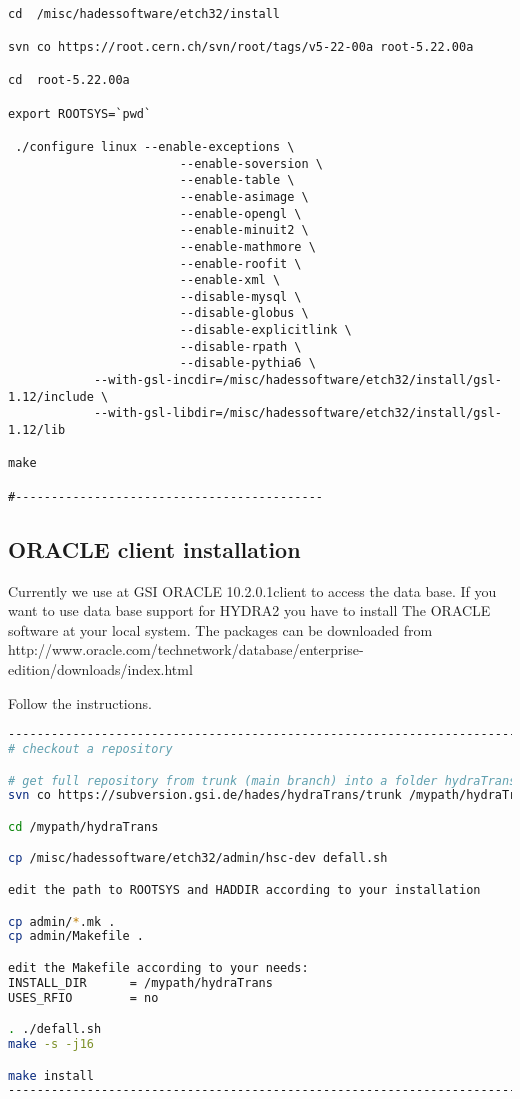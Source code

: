 \begin{lstlisting}

cd  /misc/hadessoftware/etch32/install

svn co https://root.cern.ch/svn/root/tags/v5-22-00a root-5.22.00a

cd  root-5.22.00a

export ROOTSYS=`pwd`

 ./configure linux --enable-exceptions \
                        --enable-soversion \
                        --enable-table \
                        --enable-asimage \
                        --enable-opengl \
                        --enable-minuit2 \
                        --enable-mathmore \
                        --enable-roofit \
                        --enable-xml \
                        --disable-mysql \
                        --disable-globus \
                        --disable-explicitlink \
                        --disable-rpath \
                        --disable-pythia6 \
 			--with-gsl-incdir=/misc/hadessoftware/etch32/install/gsl-1.12/include \
 			--with-gsl-libdir=/misc/hadessoftware/etch32/install/gsl-1.12/lib

make

#-------------------------------------------
\end{lstlisting}

\subsection{ORACLE client installation}\label{Chapter_ORA_install}

Currently we use at GSI ORACLE 10.2.0.1client to access the data base.
If you want to use data base support for HYDRA2 you have to install
The ORACLE software at your local system. The packages can be downloaded
from
\newline
http://www.oracle.com/technetwork/database/enterprise-edition/downloads/index.html

Follow the instructions.



\begin{lstlisting}[language=bash]
---------------------------------------------------------------------------------
# checkout a repository

# get full repository from trunk (main branch) into a folder hydraTrans
svn co https://subversion.gsi.de/hades/hydraTrans/trunk /mypath/hydraTrans

cd /mypath/hydraTrans

cp /misc/hadessoftware/etch32/admin/hsc-dev defall.sh

edit the path to ROOTSYS and HADDIR according to your installation

cp admin/*.mk .
cp admin/Makefile .

edit the Makefile according to your needs:
INSTALL_DIR      = /mypath/hydraTrans
USES_RFIO        = no

. ./defall.sh
make -s -j16

make install
---------------------------------------------------------------------------------
\end{lstlisting}

